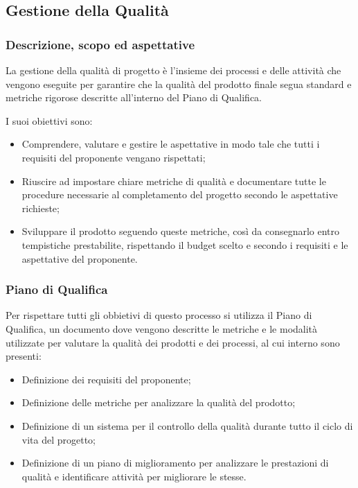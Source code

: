 \pagebreak %
\subsection{Gestione della Qualità}

\subsubsection{Descrizione, scopo ed aspettative}
La gestione della qualità di progetto è l'insieme dei processi e delle attività che vengono eseguite per garantire che la qualità del prodotto finale
segua standard e metriche rigorose descritte all'interno del Piano di Qualifica.

I suoi obiettivi sono:
\begin{itemize}
    \item Comprendere, valutare e gestire le aspettative in modo tale che tutti i requisiti del proponente vengano rispettati;
    \item Riuscire ad impostare chiare metriche di qualità e documentare tutte le procedure necessarie al completamento del progetto secondo le aspettative richieste;
    \item Sviluppare il prodotto seguendo queste metriche, così da consegnarlo entro tempistiche prestabilite, rispettando il budget scelto e secondo i requisiti e le aspettative del proponente.
\end{itemize}
\subsubsection{Piano di Qualifica}

Per rispettare tutti gli obbietivi di questo processo si utilizza il Piano di Qualifica, un documento dove vengono descritte le metriche e le modalità utilizzate per valutare la qualità dei prodotti e dei processi,
al cui interno sono presenti:

\begin{itemize}
    \item Definizione dei requisiti del proponente; %
    \item Definizione delle metriche per analizzare la qualità del prodotto;
    \item Definizione di un sistema per il controllo della qualità durante tutto il ciclo di vita del progetto;
    \item Definizione di un piano di miglioramento per analizzare le prestazioni di qualità e identificare attività per migliorare le stesse.
\end{itemize}

